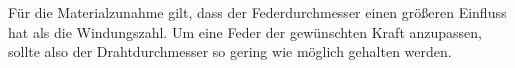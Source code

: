 Für die Materialzunahme gilt, dass der Federdurchmesser einen größeren Einfluss hat als die Windungszahl.
Um eine Feder der gewünschten Kraft anzupassen, sollte also der Drahtdurchmesser so gering wie möglich gehalten werden.









